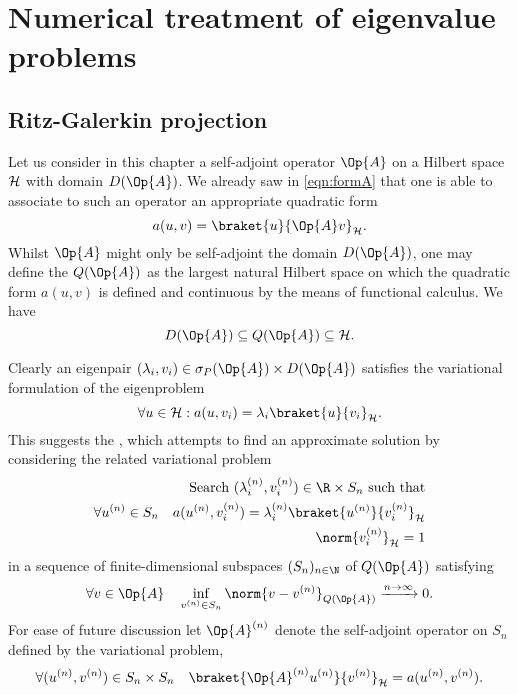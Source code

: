 \chapter{Numerical treatment of eigenvalue problems}


\section{Ritz-Galerkin projection}
\label{sec:RitzGalerkin}
Let us consider in this chapter a self-adjoint operator $\Op{A}$
on a Hilbert space $\mathcal{H}$ with domain $D(\Op{A})$.
We already saw in \eqref{eqn:formA} that one is able
to associate to such an operator an appropriate quadratic form
\[ a(u, v) = \braket{u}{\Op{A} v}_\hilbert. \]
Whilst $\Op{A}$ might only be self-adjoint the domain $D(\Op{A})$,
one may define the  $Q(\Op{A})$ as the largest
natural Hilbert space on which the quadratic form $a(u, v)$
is defined and continuous by the means of functional calculus.
We have
\[ D(\Op{A}) \subseteq Q(\Op{A}) \subseteq \hilbert. \]

Clearly an eigenpair $(\lambda_i, v_i) \in \sigma_P(\Op{A}) \times D(\Op{A})$
satisfies the variational formulation of the eigenproblem
\[ \forall u \in \hilbert: a(u, v_i) = \lambda_i \braket{u}{v_i}_\hilbert. \]
This suggests the ,
which attempts to find an approximate solution by considering
the related variational problem
\begin{align}
	\text{Search $(\lambda_i^{(n)}, v_i^{(n)}) \in \R \times S_n$ such that} \\
	\forall u^{(n)} \in S_n \quad a(u^{(n)}, v_i^{(n)})
		= \lambda_i^{(n)} \braket{u^{(n)}}{v_i^{(n)}}_\hilbert \\
	\norm{v_i^{(n)}}_\hilbert = 1
	\label{eqn:varProblem}
\end{align}
in a sequence of finite-dimensional subspaces $(S_n)_{n\in\N}$
of $Q(\Op{A})$ satisfying
\[ \forall v \in \Op{A} \quad \inf_{v^{(n)} \in S_n} \norm{v - v^{(n)}}_{Q(\Op{A})} \xrightarrow{n\to \infty} 0. \]
For ease of future discussion let $\Op{A}^{(n)}$ denote the self-adjoint
operator on $S_n$ defined by the variational problem, \ie
\[ \forall (u^{(n)}, v^{(n)}) \in S_n \times S_n \quad \braket{\Op{A}^{(n)} u^{(n)}}{v^{(n)}}_\hilbert = a(u^{(n)}, v^{(n)}). \]

